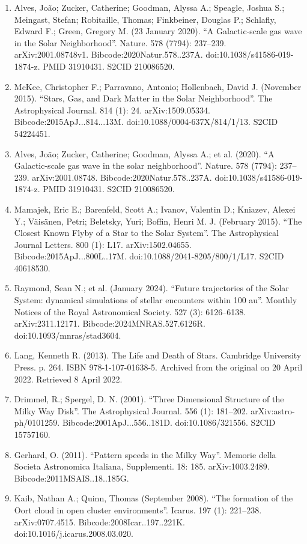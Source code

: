 \begin{enumerate}
\item Alves, João; Zucker, Catherine; Goodman, Alyssa A.; Speagle, Joshua S.; Meingast, Stefan; Robitaille, Thomas; Finkbeiner, Douglas P.; Schlafly, Edward F.; Green, Gregory M. (23 January 2020). ``A Galactic-scale gas wave in the Solar Neighborhood''. Nature. 578 (7794): 237–239. arXiv:2001.08748v1. Bibcode:2020Natur.578..237A. doi:10.1038/s41586-019-1874-z. PMID 31910431. S2CID 210086520.
\item McKee, Christopher F.; Parravano, Antonio; Hollenbach, David J. (November 2015). ``Stars, Gas, and Dark Matter in the Solar Neighborhood''. The Astrophysical Journal. 814 (1): 24. arXiv:1509.05334. Bibcode:2015ApJ...814...13M. doi:10.1088/0004-637X/814/1/13. S2CID 54224451.
\item Alves, João; Zucker, Catherine; Goodman, Alyssa A.; et al. (2020). ``A Galactic-scale gas wave in the solar neighborhood''. Nature. 578 (7794): 237–239. arXiv:2001.08748. Bibcode:2020Natur.578..237A. doi:10.1038/s41586-019-1874-z. PMID 31910431. S2CID 210086520.
\item Mamajek, Eric E.; Barenfeld, Scott A.; Ivanov, Valentin D.; Kniazev, Alexei Y.; Väisänen, Petri; Beletsky, Yuri; Boffin, Henri M. J. (February 2015). ``The Closest Known Flyby of a Star to the Solar System''. The Astrophysical Journal Letters. 800 (1): L17. arXiv:1502.04655. Bibcode:2015ApJ...800L..17M. doi:10.1088/2041-8205/800/1/L17. S2CID 40618530.
\item Raymond, Sean N.; et al. (January 2024). ``Future trajectories of the Solar System: dynamical simulations of stellar encounters within 100 au''. Monthly Notices of the Royal Astronomical Society. 527 (3): 6126–6138. arXiv:2311.12171. Bibcode:2024MNRAS.527.6126R. doi:10.1093/mnras/stad3604.
\item Lang, Kenneth R. (2013). The Life and Death of Stars. Cambridge University Press. p. 264. ISBN 978-1-107-01638-5. Archived from the original on 20 April 2022. Retrieved 8 April 2022.
\item Drimmel, R.; Spergel, D. N. (2001). ``Three Dimensional Structure of the Milky Way Disk''. The Astrophysical Journal. 556 (1): 181–202. arXiv:astro-ph/0101259. Bibcode:2001ApJ...556..181D. doi:10.1086/321556. S2CID 15757160.
\item Gerhard, O. (2011). ``Pattern speeds in the Milky Way''. Memorie della Societa Astronomica Italiana, Supplementi. 18: 185. arXiv:1003.2489. Bibcode:2011MSAIS..18..185G.
\item Kaib, Nathan A.; Quinn, Thomas (September 2008). ``The formation of the Oort cloud in open cluster environments''. Icarus. 197 (1): 221–238. arXiv:0707.4515. Bibcode:2008Icar..197..221K. doi:10.1016/j.icarus.2008.03.020.

\end{enumerate}
